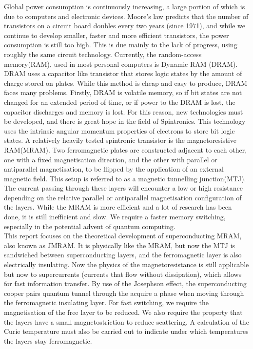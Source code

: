 \documentclass[12pt]{article}
\begin{document}
Global power consumption is continuously increasing, a large portion of which is due to computers and electronic devices. Moore’s law predicts that the number of transistors on a circuit board doubles every two years (since 1971), and while we continue to develop smaller, faster and more efficient transistors, the power consumption is still too high\cite{mram}. This is due mainly to the lack of progress, using roughly the same circuit technology. Currently, the random-access memory(RAM), used in most personal computers is Dynamic RAM (DRAM). DRAM uses a capacitor like transistor that stores logic states by the amount of charge stored on plates. While this method is cheap and easy to produce, DRAM faces many problems. Firstly, DRAM is volatile memory, so if bit states are not changed for an extended period of time, or if power to the DRAM is lost, the capacitor discharges and memory is lost. For this reason, new technologies must be developed, and there is great hope in the field of Spintronics\cite{fundapp}. This technology uses the intrinsic angular momentum properties of electrons to store bit logic states. A relatively heavily tested spintronic transistor is the magnetoresistive RAM(MRAM). Two ferromagnetic plates are constructed adjacent to each other, one with a fixed magnetisation direction, and the other with parallel or antiparallel magnetisation, to be flipped by the application of an external magnetic field. This setup is referred to as a magnetic tunnelling junction(MTJ).  The current passing through these layers will encounter a low or high resistance depending on the relative parallel or antiparallel magnetisation configuration of the layers. While the MRAM is more efficient and a lot of research\cite{mram} has been done, it is still inefficient and slow. We require a faster memory switching, especially in the potential advent of quantum computing. 
\\This report focuses on the theoretical development of superconducting MRAM, also known as JMRAM. It is physically like the MRAM, but now the MTJ is sandwiched between superconducting layers, and the ferromagnetic layer is also electrically insulating.  Now the physics of the magnetoresistance is still applicable but now to supercurrents (currents that flow without dissipation), which allows for fast information transfer. By use of the Josephson effect\cite{josephson}, the superconducting cooper pairs\cite{BCS} quantum tunnel through the acquire a phase when moving through the ferromagnetic insulating layer. For fast switching, we require the magnetisation of the free layer to be reduced. We also require the property that the layers have a small magnetostriction to reduce scattering. A calculation of the Curie temperature must also be carried out to indicate under which temperatures the layers stay ferromagnetic.
\end{document}
